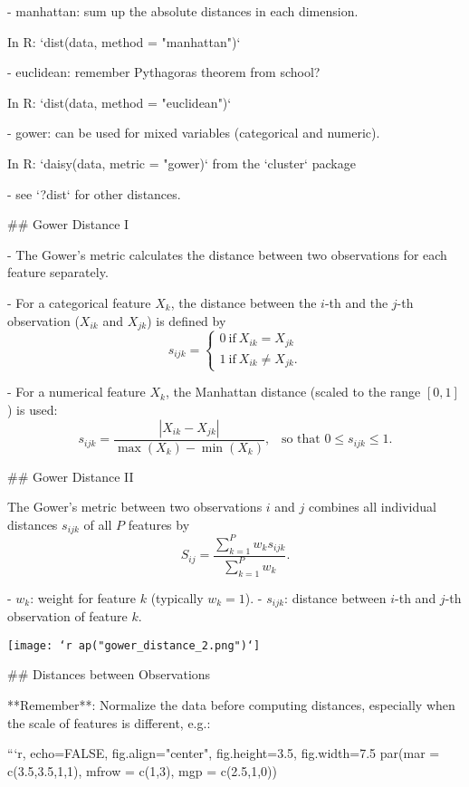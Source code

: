 - \small manhattan: sum up the absolute distances in each dimension.

    In R: `dist(data, method = "manhattan")`

- \small euclidean: remember Pythagoras theorem from school?

    In R: `dist(data, method = "euclidean")`

- \small gower: can be used for mixed variables (categorical and numeric).

    In R: `daisy(data, metric = "gower)` from the `cluster` package

- \small see `?dist` for other distances.

## Gower Distance I

- The Gower's metric calculates the distance between two observations for each feature separately.

- For a categorical feature $X_k$, the distance between the $i$-th and the $j$-th observation ($X_{ik}$ and $X_{jk}$) is defined by
$$s_{ijk}=\begin{cases} 0\ \text{if}\ X_{ik}=X_{jk} \\ 1\ \text{if}\ X_{ik}\neq X_{jk}.\end{cases}$$

- For a numerical feature $X_k$, the Manhattan distance (scaled to the range $[0,1]$) is used:
$$s_{ijk}=\frac{|X_{ik}-X_{jk}|}{\max(X_k)-\min(X_k)}, \;\;\; \text{so that } 0 \leq s_{ijk} \leq 1.$$

## Gower Distance II

The Gower's metric between two observations $i$ and $j$ combines all individual distances $s_{ijk}$ of all $P$ features by
$$S_{ij}=\dfrac{\sum_{k=1}^P w_{k} s_{ijk}}{\sum_{k=1}^P w_{k}}.$$

  - $w_k$: weight for feature $k$ (typically $w_k = 1$).
  - $s_{ijk}$: distance between $i$-th and $j$-th observation of feature $k$.

\begin{center}
\texttt{[image: `r ap("gower\_distance\_2.png")`]}
\end{center}

## Distances between Observations

**Remember**: Normalize the data before computing distances, especially when the scale of features is different, e.g.:

```{r, echo=FALSE, fig.align="center", fig.height=3.5, fig.width=7.5}
par(mar = c(3.5,3.5,1,1), mfrow = c(1,3), mgp = c(2.5,1,0))

